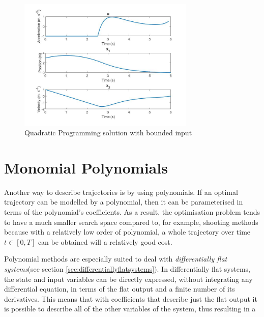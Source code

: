 \begin{figure}[h!]
\centering
\includegraphics[width=0.75\textwidth]{Images/quad_prog_constrained.jpg}
\caption{Quadratic Programming solution with bounded input}
\label{fig:solution_quad_prog_con}
\end{figure}


\section{Monomial Polynomials}

\par Another way to describe trajectories is by using polynomials. If an optimal trajectory can be modelled by a polynomial, then it can be parameterised in terms of the polynomial's coefficients. As a result, the optimisation problem tends to have a much smaller search space compared to, for example, shooting methods because with a relatively low order of polynomial, a whole trajectory over time $t\in [0,T]$ can be obtained will a relatively good cost. 
\par Polynomial methods are especially suited to deal with \textit{differentially flat systems}(see section \ref{sec:differentiallyflatsystems}). In differentially flat systems, the state and input variables can be directly expressed, without integrating any differential equation, in terms of the flat output and a finite number of its derivatives\cite{fliess1995flatness}. This means that with coefficients that describe just the flat output it is possible to describe all of the other variables of the system, thus resulting in a 

